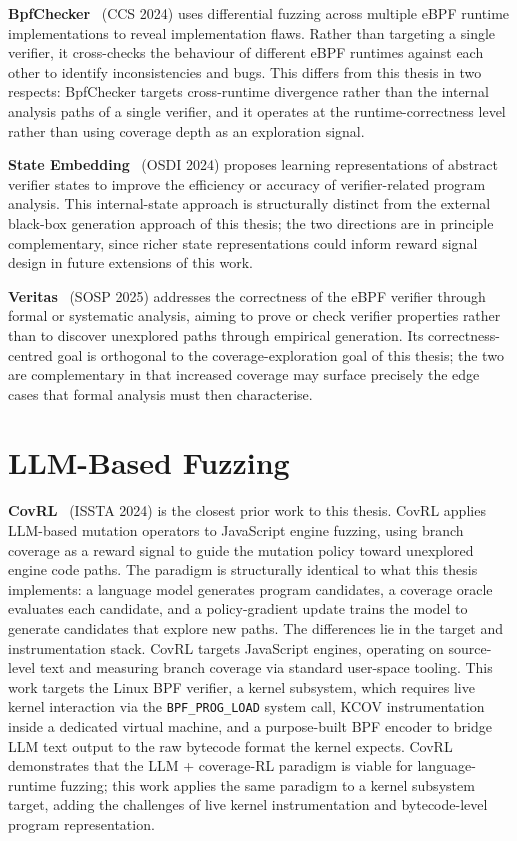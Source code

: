 \textbf{BpfChecker}~\cite{bpfchecker} (CCS 2024) uses differential fuzzing
across multiple eBPF runtime implementations to reveal implementation flaws.
Rather than targeting a single verifier, it cross-checks the behaviour of
different eBPF runtimes against each other to identify inconsistencies and bugs.
This differs from this thesis in two respects: BpfChecker targets
cross-runtime divergence rather than the internal analysis paths of a single
verifier, and it operates at the runtime-correctness level rather than using
coverage depth as an exploration signal.

\textbf{State Embedding}~\cite{state-embedding} (OSDI 2024) proposes learning
representations of abstract verifier states to improve the efficiency or accuracy
of verifier-related program analysis.
This internal-state approach is structurally distinct from the external black-box
generation approach of this thesis; the two directions are in principle
complementary, since richer state representations could inform reward signal
design in future extensions of this work.

\textbf{Veritas}~\cite{veritas} (SOSP 2025) addresses the correctness of the
eBPF verifier through formal or systematic analysis, aiming to prove or check
verifier properties rather than to discover unexplored paths through empirical
generation.
Its correctness-centred goal is orthogonal to the coverage-exploration goal of
this thesis; the two are complementary in that increased coverage may surface
precisely the edge cases that formal analysis must then characterise.

\section{LLM-Based Fuzzing}
\label{sec:rw-llm-fuzzing}

\textbf{CovRL}~\cite{covrl} (ISSTA 2024) is the closest prior work to this thesis.
CovRL applies LLM-based mutation operators to JavaScript engine fuzzing, using
branch coverage as a reward signal to guide the mutation policy toward unexplored
engine code paths.
The paradigm is structurally identical to what this thesis implements: a language
model generates program candidates, a coverage oracle evaluates each candidate,
and a policy-gradient update trains the model to generate candidates that explore
new paths.
The differences lie in the target and instrumentation stack.
CovRL targets JavaScript engines, operating on source-level text and measuring
branch coverage via standard user-space tooling.
This work targets the Linux BPF verifier, a kernel subsystem, which requires live
kernel interaction via the \texttt{BPF\_PROG\_LOAD} system call, KCOV
instrumentation inside a dedicated virtual machine, and a purpose-built BPF
encoder to bridge LLM text output to the raw bytecode format the kernel expects.
CovRL demonstrates that the LLM + coverage-RL paradigm is viable for
language-runtime fuzzing; this work applies the same paradigm to a kernel
subsystem target, adding the challenges of live kernel instrumentation and
bytecode-level program representation.

